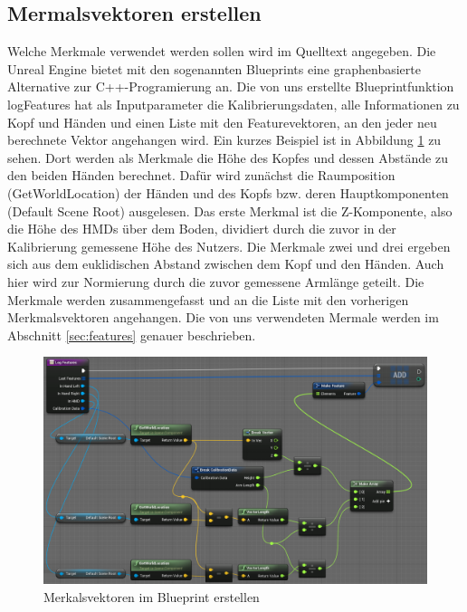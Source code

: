 \subsection{Mermalsvektoren erstellen}
Welche Merkmale verwendet werden sollen wird im Quelltext angegeben. Die Unreal Engine bietet mit den sogenannten Blueprints eine graphenbasierte Alternative zur C++-Programierung an. Die von uns erstellte Blueprintfunktion \glqq{}logFeatures\grqq{} hat als Inputparameter die Kalibrierungsdaten, alle Informationen zu Kopf und Händen und einen Liste mit den Featurevektoren, an den jeder neu berechnete Vektor angehangen wird. Ein kurzes Beispiel ist in Abbildung \ref{fig:log-features} zu sehen. Dort werden als Merkmale die Höhe des Kopfes und dessen Abstände zu den beiden Händen berechnet. Dafür wird zunächst die Raumposition (\glqq{}GetWorldLocation\grqq{}) der Händen und des Kopfs bzw. deren Hauptkomponenten (\glqq{}Default Scene Root\grqq{}) ausgelesen. Das erste Merkmal ist die Z-Komponente, also die Höhe des HMDs über dem Boden, dividiert durch die zuvor in der Kalibrierung gemessene Höhe des Nutzers. Die Merkmale zwei und drei ergeben sich aus dem euklidischen Abstand zwischen dem Kopf und den Händen. Auch hier wird zur Normierung durch die zuvor gemessene Armlänge geteilt. Die Merkmale werden zusammengefasst und an die Liste mit den vorherigen Merkmalsvektoren angehangen. Die von uns verwendeten Mermale werden im Abschnitt \ref{sec:features} genauer beschrieben.
\begin{figure}[hbtp]
\includegraphics[width=1.0\linewidth]{LogFeatures.png}
\caption{Merkalsvektoren im Blueprint erstellen}
\label{fig:log-features}
\end{figure}

